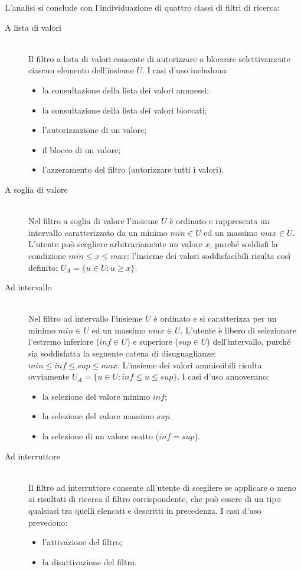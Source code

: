 L'analisi si conclude con l'individuazione di quattro classi di filtri di ricerca:
\begin{description}
	\item[A lista di valori] \hfill \\
	Il filtro a lista di valori consente di autorizzare o bloccare selettivamente ciascun elemento dell'insieme $U$. I casi d'uso includono:
	\begin{itemize}
		\item la consultazione della lista dei valori ammessi;
		\item la consultazione della lista dei valori bloccati;
		\item l'autorizzazione di un valore;
		\item il blocco di un valore;
		\item l'azzeramento del filtro (autorizzare tutti i valori).
	\end{itemize}
	\item[A soglia di valore] \hfill \\
	Nel filtro a soglia di valore l'insieme $U$ è ordinato e rappresenta un intervallo caratterizzato da un minimo $min \in U$ ed un massimo $max \in U$. L'utente può scegliere arbitrariamente un valore $x$, purché soddisfi la condizione $min \leq x \leq max$: l'insieme dei valori soddisfacibili risulta così definito: $U_A = \lbrace u \in U : u \geq x \rbrace$.
	\item[Ad intervallo] \hfill \\
	Nel filtro ad intervallo l'insieme $U$ è ordinato e si caratterizza per un minimo $min \in U$ ed un massimo $max \in U$. L'utente è libero di selezionare l'estremo inferiore ($inf \in U$) e superiore ($sup\in U$) dell'intervallo, purché sia soddisfatta la seguente catena di disuguaglianze: $min \leq inf \leq sup \leq max$. L'insieme dei valori ammissibili risulta ovviamente $U_A = \lbrace u \in U : inf \leq u \leq sup \rbrace$. I casi d'uso annoverano:
	\begin{itemize}
		\item la selezione del valore minimo $inf$;
		\item la selezione del valore massimo $sup$.
		\item la selezione di un valore esatto ($inf = sup$).
	\end{itemize}
	\item[Ad interruttore] \hfill \\
	Il filtro ad interruttore consente all'utente di scegliere se applicare o meno ai risultati di ricerca il filtro corrispondente, che può essere di un tipo qualsiasi tra quelli elencati e descritti in precedenza. I casi d'uso prevedono:
	\begin{itemize}
		\item l'attivazione del filtro;
		\item la disattivazione del filtro.
	\end{itemize}
\end{description}

